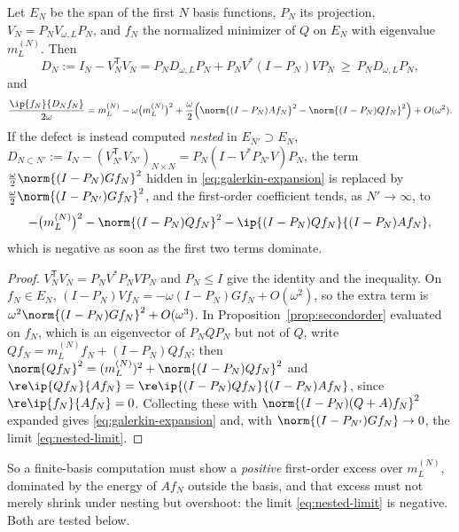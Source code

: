 \begin{proposition}\label{prop:galerkin}
Let $E_N$ be the span of the first $N$ basis functions, $P_N$ its projection,
$V_N=P_NV_{\omega,L}P_N$, and $f_N$ the normalized minimizer of $Q$ on $E_N$
with eigenvalue $m_L^{(N)}$. Then
\begin{equation}\label{eq:galerkin-defect}
 D_N:=I_N-V_N^{\mathsf T}V_N=P_ND_{\omega,L}P_N+P_NV^*(I-P_N)VP_N\ \geq\ P_ND_{\omega,L}P_N ,
\end{equation}
and
\begin{equation}\label{eq:galerkin-expansion}
 \frac{\ip{f_N}{D_Nf_N}}{2\omega}=m_L^{(N)}-\omega\big(m_L^{(N)}\big)^2
 +\frac\omega2\Big(\norm{(I-P_N)Af_N}^2-\norm{(I-P_N)Qf_N}^2\Big)+O(\omega^2).
\end{equation}
If the defect is instead computed \emph{nested} in $E_{N'}\supset E_N$,
$D_{N\subset N'}:=I_N-(V_{N'}^{\mathsf T}V_{N'})_{N\times N}=P_N(I-V^*P_{N'}V)P_N$,
the term $\frac\omega2\norm{(I-P_N)Gf_N}^2$ hidden in
\eqref{eq:galerkin-expansion} is replaced by $\frac\omega2\norm{(I-P_{N'})Gf_N}^2$,
and the first-order coefficient tends, as $N'\to\infty$, to
\begin{equation}\label{eq:nested-limit}
 -\big(m_L^{(N)}\big)^2-\norm{(I-P_N)Qf_N}^2-\ip{(I-P_N)Qf_N}{(I-P_N)Af_N},
\end{equation}
which is negative as soon as the first two terms dominate.
\end{proposition}
\begin{proof}
$V_N^{\mathsf T}V_N=P_NV^*P_NVP_N$ and $P_N\leq I$ give the identity and the
inequality. On $f_N\in E_N$, $(I-P_N)Vf_N=-\omega(I-P_N)Gf_N+O(\omega^2)$, so the
extra term is $\omega^2\norm{(I-P_N)Gf_N}^2+O(\omega^3)$. In
Proposition~\ref{prop:secondorder} evaluated on $f_N$, which is an eigenvector
of $P_NQP_N$ but not of $Q$, write $Qf_N=m_L^{(N)}f_N+(I-P_N)Qf_N$; then
$\norm{Qf_N}^2=(m_L^{(N)})^2+\norm{(I-P_N)Qf_N}^2$ and
$\re\ip{Qf_N}{Af_N}=\re\ip{(I-P_N)Qf_N}{(I-P_N)Af_N}$, since $\re\ip{f_N}{Af_N}=0$. Collecting these with
$\norm{(I-P_N)(Q+A)f_N}^2$ expanded gives \eqref{eq:galerkin-expansion} and,
with $\norm{(I-P_{N'})Gf_N}\to0$, the limit \eqref{eq:nested-limit}.
\end{proof}

So a finite-basis computation must show a \emph{positive} first-order excess
over $m_L^{(N)}$, dominated by the energy of $Af_N$ outside the basis, and that
excess must not merely shrink under nesting but overshoot: the limit
\eqref{eq:nested-limit} is negative. Both are tested below.

